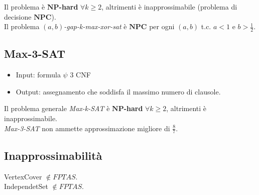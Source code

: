 \documentclass[a4paper]{article}
\theoremstyle{definition}
\newcommand{\np}{\mathbf{NP}}
\newcommand{\npc}{\mathbf{NPC}}
\begin{document}
		\noindent
		Il problema è $\np$\textbf{-hard} $\forall k \geq 2$, altrimenti è inapprossimabile (problema di decisione $\npc$).\\
		Il problema $(a,b)$\textit{-gap-k-max-xor-sat} è $\npc$ per ogni $(a, b)$ t.c. $a<1$ e $b > \frac{1}{2}$.
		
		
		\subsection{Max-3-SAT}
		\begin{itemize}
			\item Input: formula $\psi$ 3 CNF
			\item Output: assegnamento che soddisfa il massimo numero di clausole.
		\end{itemize}
	
	\noindent
	Il problema generale \textit{Max-k-SAT} è $\np$\textbf{-hard} $\forall k \geq 2$, altrimenti è inapprossimabile.\\
	\textit{Max-3-SAT} non ammette approssimazione migliore di $\frac{8}{7}$.
	
		
		\subsection{Inapprossimabilità}
		VertexCover $\notin FPTAS$.\\
		IndependetSet $\notin FPTAS$.
		
		
\end{document}
